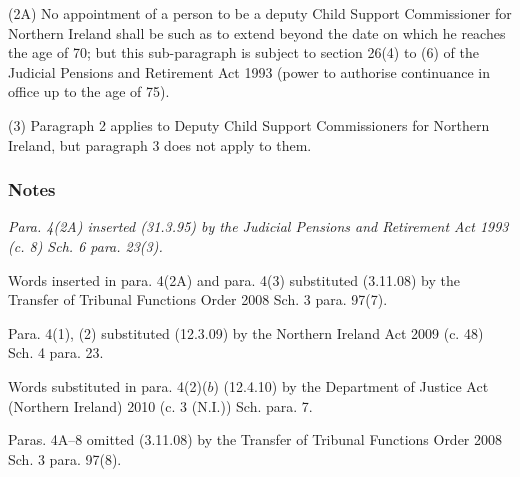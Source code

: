 \documentclass[a4paper]{article}
\newcommand\amendment[1]{\subsubsection*{Notes}{\itshape\frenchspacing\footnotesize #1 \par}}
\begin{document}
(2A) No appointment of a person to be a deputy Child Support Commissioner for Northern Ireland shall be such as to extend beyond the date on which he reaches the age of 70; but this sub-paragraph is subject to section 26(4) to (6) of the Judicial Pensions and Retirement Act 1993 (power to authorise continuance in office up to the age of 75).

(3) Paragraph 2 applies to Deputy Child Support Commissioners for Northern Ireland, but paragraph 3 does not apply to them.

\amendment{
Para. 4(2A) inserted (31.3.95) by the Judicial Pensions and Retirement Act 1993 (c. 8) Sch. 6 para. 23(3).

Words inserted in para. 4(2A) and para. 4(3) substituted (3.11.08) by the Transfer of Tribunal Functions Order 2008  Sch. 3 para. 97(7).

Para. 4(1), (2) substituted (12.3.09) by the Northern Ireland Act 2009 (c. 48) Sch. 4 para. 23.

Words substituted in para. 4(2)($b$) (12.4.10) by the Department of Justice Act (Northern Ireland) 2010 (c. 3 (N.I.)) Sch. para. 7.

\medskip

Paras. 4A--8 omitted (3.11.08) by the Transfer of Tribunal Functions Order 2008  Sch. 3 para. 97(8).

}
\end{document}
